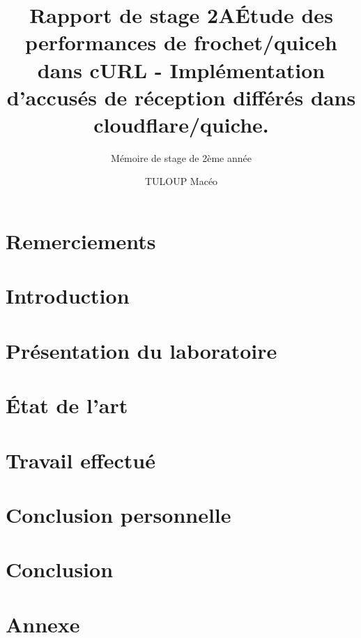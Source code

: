 \documentclass{rapport_de_stage}
\title{Rapport de stage 2A} %
\title{Étude des performances de frochet/quiceh dans cURL - Implémentation d'accusés de réception différés dans cloudflare/quiche.}
\subtitle{Mémoire de stage de 2ème année}
\author{TULOUP Macéo}
\begin{document}
\maketitle

\section{Remerciements}

\newpage



\newpage

\toc %



\section{Introduction}

\newpage


\section{Présentation du laboratoire}

\newpage


\section{État de l'art}

\newpage


\section{Travail effectué}

\newpage


\section{Conclusion personnelle}

\newpage


\section{Conclusion} 

\newpage


\printbibliography[heading=bibintoc, title={~~~~Bibliographie}]
\newpage


\section{Annexe}

\newpage
\end{document}
